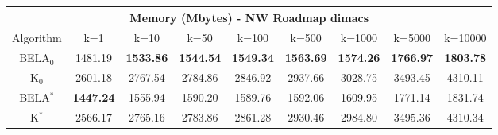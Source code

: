 \begin{tabular}{c|cccccccc}\toprule
\multicolumn{9}{c}{Memory (Mbytes) - NW Roadmap dimacs}\\ \midrule
Algorithm & k=1 & k=10 & k=50 & k=100 & k=500 & k=1000 & k=5000 & k=10000 \\ \midrule
BELA$_0$ & 1481.19 & \textbf{1533.86} & \textbf{1544.54} & \textbf{1549.34} & \textbf{1563.69} & \textbf{1574.26} & \textbf{1766.97} & \textbf{1803.78} \\
K$_0$ & 2601.18 & 2767.54 & 2784.86 & 2846.92 & 2937.66 & 3028.75 & 3493.45 & 4310.11 \\
BELA$^*$ & \textbf{1447.24} & 1555.94 & 1590.20 & 1589.76 & 1592.06 & 1609.95 & 1771.14 & 1831.74 \\
K$^*$ & 2566.17 & 2765.16 & 2783.86 & 2861.28 & 2930.46 & 2984.80 & 3495.36 & 4310.34 \\ \bottomrule 
\end{tabular}
